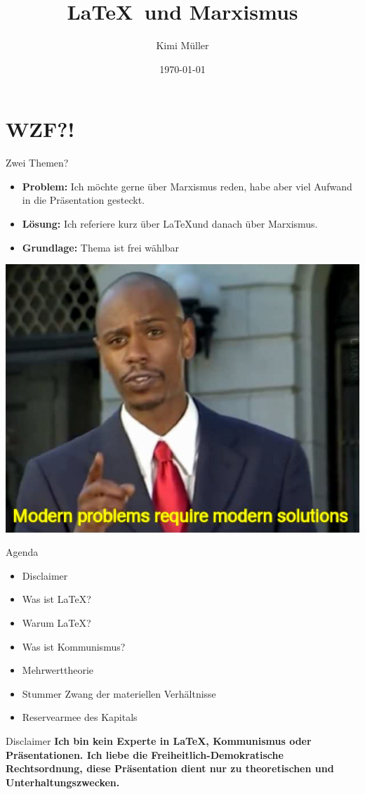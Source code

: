 \documentclass{beamer}
\title{\LaTeX \  und Marxismus}
\date{\today}
\author{Kimi Müller}
\begin{document}
  \maketitle
  \section{WZF?!}
  \begin{frame}{Zwei Themen?}
    \begin{itemize}
        \item<1-> \textbf{Problem:} Ich möchte gerne über Marxismus reden, habe aber viel Aufwand in die Präsentation gesteckt.
        \item<2-> \textbf{Lösung:} Ich referiere kurz über \LaTeX und danach über Marxismus.
        \item<3-> \textbf{Grundlage:} Thema ist frei wählbar
    \end{itemize}
  \end{frame}
  \begin{frame}
    \includegraphics[width=\textwidth]{Modern_Problems_Require_Modern_Solutions.jpg}
  \end{frame}
  \begin{frame}{Agenda}
\begin{itemize}
    \item<2-> Disclaimer
    \item<3-> Was ist \LaTeX?
    \item<4-> Warum \LaTeX?
    \item<5-> Was ist Kommunismus?
    \item<6-> Mehrwerttheorie
    \item<7-> Stummer Zwang der materiellen Verhältnisse
    \item<8-> Reservearmee des Kapitals
\end{itemize}
  \end{frame}
  \begin{frame}{Disclaimer}
\textbf{Ich bin kein Experte in \LaTeX, Kommunismus oder Präsentationen. Ich liebe die Freiheitlich-Demokratische Rechtsordnung, diese Präsentation dient nur zu theoretischen und Unterhaltungszwecken.}
\end{frame}
\end{document}
